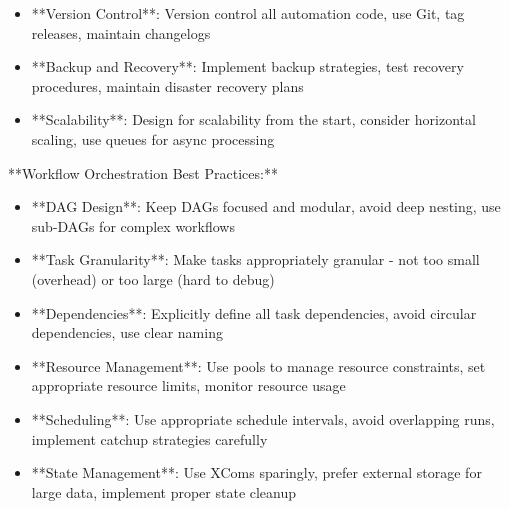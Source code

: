\documentclass[11pt,a4paper]{article}
\begin{document}
\begin{itemize}
\item **Version Control**: Version control all automation code, use Git, tag releases, maintain changelogs
\end{itemize}

\begin{itemize}
\item **Backup and Recovery**: Implement backup strategies, test recovery procedures, maintain disaster recovery plans
\end{itemize}

\begin{itemize}
\item **Scalability**: Design for scalability from the start, consider horizontal scaling, use queues for async processing
\end{itemize}

**Workflow Orchestration Best Practices:**

\begin{itemize}
\item **DAG Design**: Keep DAGs focused and modular, avoid deep nesting, use sub-DAGs for complex workflows
\end{itemize}

\begin{itemize}
\item **Task Granularity**: Make tasks appropriately granular - not too small (overhead) or too large (hard to debug)
\end{itemize}

\begin{itemize}
\item **Dependencies**: Explicitly define all task dependencies, avoid circular dependencies, use clear naming
\end{itemize}

\begin{itemize}
\item **Resource Management**: Use pools to manage resource constraints, set appropriate resource limits, monitor resource usage
\end{itemize}

\begin{itemize}
\item **Scheduling**: Use appropriate schedule intervals, avoid overlapping runs, implement catchup strategies carefully
\end{itemize}

\begin{itemize}
\item **State Management**: Use XComs sparingly, prefer external storage for large data, implement proper state cleanup
\end{itemize}
\end{document}
